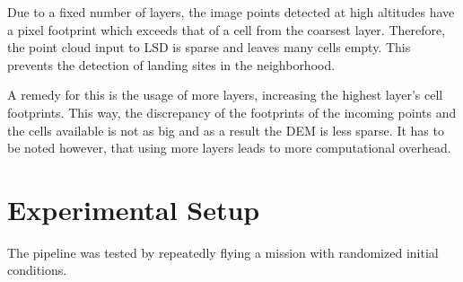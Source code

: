 Due to a fixed number of layers, the image points detected at high altitudes have a pixel footprint which exceeds that of a cell from the coarsest layer. Therefore, the point cloud input to LSD is sparse and leaves many cells empty. This prevents the detection of landing sites in the neighborhood. %

A remedy for this is the usage of more layers, increasing the highest layer's cell footprints. This way, the discrepancy of the footprints of the incoming points and the cells available is not as big and as a result the DEM is less sparse. It has to be noted however, that using more layers leads to more computational overhead. %

\section{Experimental Setup}\label{sec:exp_setup}

The pipeline was tested by repeatedly flying a mission with randomized initial conditions.

